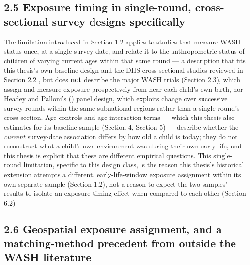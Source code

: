 \subsection*{2.5 Exposure timing in single-round, cross-sectional survey designs specifically}

The limitation introduced in Section 1.2 applies to studies that measure WASH status once, at a single survey date, and relate it to the anthropometric status of children of varying current ages within that same round --- a description that fits this thesis's own baseline design and the DHS cross-sectional studies reviewed in Section 2.2 \parencite{Rakotomanana2020,Addae2024,Gunther2010,Spears2013}, but does \textbf{not} describe the major WASH trials (Section 2.3), which assign and measure exposure prospectively from near each child's own birth, nor Headey and Palloni's (\citeyear{HeadeyPalloni2019}) panel design, which exploits change over successive survey rounds within the same subnational regions rather than a single round's cross-section. Age controls and age-interaction terms --- which this thesis also estimates for its baseline sample (Section 4, Section 5) --- describe whether the \textit{current} survey-date association differs by how old a child is today; they do not reconstruct what a child's own environment was during their own early life, and this thesis is explicit that these are different empirical questions. This single-round limitation, specific to this design class, is the reason this thesis's historical extension attempts a different, early-life-window exposure assignment within its own separate sample (Section 1.2), not a reason to expect the two samples' results to isolate an exposure-timing effect when compared to each other (Section 6.2).

\subsection*{2.6 Geospatial exposure assignment, and a matching-method precedent from outside the WASH literature}

